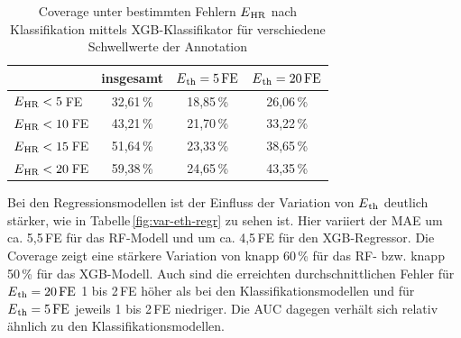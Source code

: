 \begin{table}[H]
	\centering
  	\begin{tabular}{l || c | c | c}
 											& insgesamt 		& $E\textsubscript{th}= 5\text{\,}\si{FE}$ & $E\textsubscript{th}= 20\text{\,}\si{FE}$\\\hline
 		$E\textsubscript{HR} < 5$\,\si{FE} 	&  32{,}61\,\% 	& 18,85\,\% 			& 26,06\,\%\\
 		$E\textsubscript{HR} < 10$\,\si{FE} 	&  43{,}21\,\% 	& 21,70\,\% 			& 33,22\,\%\\
 		$E\textsubscript{HR} < 15$\,\si{FE} 	&  51{,}64\,\% 	& 23,33\,\% 			& 38,65\,\%\\
 		$E\textsubscript{HR} < 20$\,\si{FE} 	&  59{,}38\,\% 	& 24,65\,\% 			& 43,35\,\%\\
 	\end{tabular}
 	\caption{Coverage unter bestimmten Fehlern $E\textsubscript{HR}$ nach Klassifikation mittels \ac{XGB}-Klassifikator für verschiedene Schwellwerte der Annotation}
 	\label{fig:xgb-clf-cov-eth}
\end{table}

Bei den Regressionsmodellen ist der Einfluss der Variation von $E\textsubscript{th}$ deutlich stärker, wie in Tabelle\,\ref{fig:var-eth-regr} zu sehen ist. Hier variiert der \ac{MAE} um ca. 5,5\,\si{FE} für das \ac{RF}-Modell und um ca. 4,5\,\si{FE} für den \ac{XGB}-Regressor. Die Coverage zeigt eine stärkere Variation von knapp 60\,\% für das \ac{RF}- bzw. knapp 50\,\% für das \ac{XGB}-Modell. Auch sind die erreichten durchschnittlichen Fehler für $E\textsubscript{th}= 20\text{\,}\si{FE}$ 1 bis 2\,\si{FE} höher als bei den Klassifikationsmodellen und für $E\textsubscript{th}= 5\text{\,}\si{FE}$ jeweils 1 bis 2\,\si{FE} niedriger. Die \ac{AUC} dagegen verhält sich relativ ähnlich zu den Klassifikationsmodellen.

